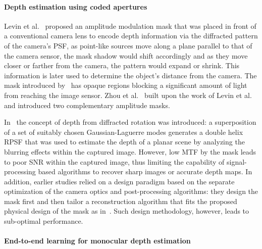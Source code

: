 \documentclass[preprint,5p,twocolumn]{elsarticle}
\begin{document}
\paragraph{Depth estimation using coded apertures}
\label{parag:2}
Levin et al.~\cite{levin2007image} proposed an amplitude modulation mask that was placed in front of a conventional camera lens to encode depth information via the diffracted pattern of the camera's PSF, as point-like sources move along a plane parallel to that of the camera sensor, the mask shadow would shift accordingly and as they move closer or farther from the camera, the pattern would expand or shrink. This information is later used to determine the object's distance from the camera. The mask introduced by~\cite{levin2007image} has opaque regions blocking a significant amount of light from reaching the image sensor. Zhou et al.~\cite{zhou2011coded} built upon the work of Levin et al.~\cite{levin2007image} and introduced two complementary amplitude masks. 

In~\cite{greengard2006depth} the concept of depth from diffracted rotation was introduced: a superposition of a set of suitably chosen Gaussian-Laguerre modes generates a double helix RPSF that was used to estimate the depth of a planar scene by analyzing the blurring effects within the captured image. However, low MTF by the mask leads to poor SNR within the captured image, thus limiting the capability of signal-processing based algorithms to recover  sharp images or  accurate depth maps.
In addition, earlier studies relied on a design paradigm based on the separate optimization of the camera optics and  post-processing algorithms:  they design the mask first and then tailor a reconstruction algorithm that fits the proposed physical design of the mask as in~\cite{kumar2013psf,kumar2015three,roider2014axial,berlich2016single}. Such design methodology, however, leads to sub-optimal performance. 

\paragraph{End-to-end learning for monocular depth estimation}
\end{document}
